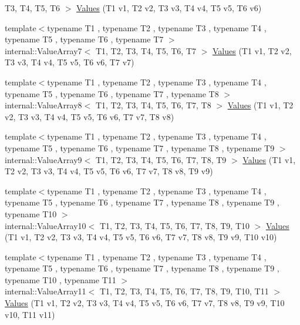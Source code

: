 \begin{DoxyCompactItemize}
\-T3, \-T4, \-T5, \-T6 $>$ \hyperlink{namespacetesting_a552772c4c4daa68b5e995e0d64651150}{\-Values} (\-T1 v1, \-T2 v2, \-T3 v3, \-T4 v4, \-T5 v5, \-T6 v6)
\item 
{\footnotesize template$<$typename T1 , typename T2 , typename T3 , typename T4 , typename T5 , typename T6 , typename T7 $>$ }\\internal\-::\-Value\-Array7$<$ \-T1, \-T2, \*
\-T3, \-T4, \-T5, \-T6, \-T7 $>$ \hyperlink{namespacetesting_a8fe9ae088304ebc64de1b076951e6eb8}{\-Values} (\-T1 v1, \-T2 v2, \-T3 v3, \-T4 v4, \-T5 v5, \-T6 v6, \-T7 v7)
\item 
{\footnotesize template$<$typename T1 , typename T2 , typename T3 , typename T4 , typename T5 , typename T6 , typename T7 , typename T8 $>$ }\\internal\-::\-Value\-Array8$<$ \-T1, \-T2, \*
\-T3, \-T4, \-T5, \-T6, \-T7, \-T8 $>$ \hyperlink{namespacetesting_a1eda12e6518e4c51c1bb2e7cc9d31ffa}{\-Values} (\-T1 v1, \-T2 v2, \-T3 v3, \-T4 v4, \-T5 v5, \-T6 v6, \-T7 v7, \-T8 v8)
\item 
{\footnotesize template$<$typename T1 , typename T2 , typename T3 , typename T4 , typename T5 , typename T6 , typename T7 , typename T8 , typename T9 $>$ }\\internal\-::\-Value\-Array9$<$ \-T1, \-T2, \*
\-T3, \-T4, \-T5, \-T6, \-T7, \-T8, \-T9 $>$ \hyperlink{namespacetesting_ab663e13807ad5cc223814797c9191a58}{\-Values} (\-T1 v1, \-T2 v2, \-T3 v3, \-T4 v4, \-T5 v5, \-T6 v6, \-T7 v7, \-T8 v8, \-T9 v9)
\item 
{\footnotesize template$<$typename T1 , typename T2 , typename T3 , typename T4 , typename T5 , typename T6 , typename T7 , typename T8 , typename T9 , typename T10 $>$ }\\internal\-::\-Value\-Array10$<$ \-T1, \-T2, \*
\-T3, \-T4, \-T5, \-T6, \-T7, \-T8, \-T9, \*
\-T10 $>$ \hyperlink{namespacetesting_a2948b0215fce80155fdbad4e3608f4cd}{\-Values} (\-T1 v1, \-T2 v2, \-T3 v3, \-T4 v4, \-T5 v5, \-T6 v6, \-T7 v7, \-T8 v8, \-T9 v9, \-T10 v10)
\item 
{\footnotesize template$<$typename T1 , typename T2 , typename T3 , typename T4 , typename T5 , typename T6 , typename T7 , typename T8 , typename T9 , typename T10 , typename T11 $>$ }\\internal\-::\-Value\-Array11$<$ \-T1, \-T2, \*
\-T3, \-T4, \-T5, \-T6, \-T7, \-T8, \-T9, \*
\-T10, \-T11 $>$ \hyperlink{namespacetesting_a4aaae77b8404038ed5f3bf56cccdb940}{\-Values} (\-T1 v1, \-T2 v2, \-T3 v3, \-T4 v4, \-T5 v5, \-T6 v6, \-T7 v7, \-T8 v8, \-T9 v9, \-T10 v10, \-T11 v11)

\end{DoxyCompactItemize}
